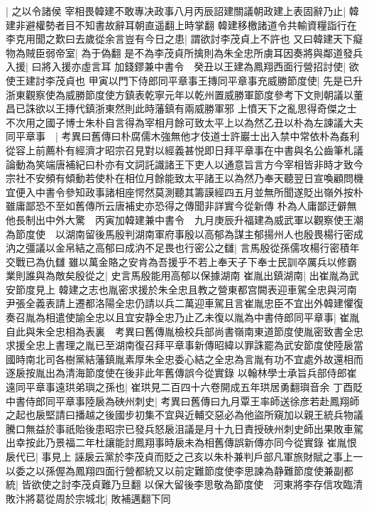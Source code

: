 |{
	之以令諸侯}
宰相畏韓建不敢專决政事八月丙辰詔建關議朝政建上表固辭乃止|{
	韓建非避權勢者目不知書故辭耳朝直遥翻上時掌翻}
韓建移檄諸道令共輸資糧詣行在李克用聞之歎曰去歲從余言豈有今日之患|{
	謂欲討李茂貞上不許也}
又曰韓建天下癡物為賊臣弱帝室|{
	為于偽翻}
是不為李茂貞所擒則為朱全忠所虜耳因奏將與鄰道發兵入援|{
	曰將入援亦虛言耳}
加錢鏐兼中書令　癸丑以王建為鳳翔西面行營招討使|{
	欲使王建討李茂貞也}
甲寅以門下侍郎同平章事王摶同平章事充威勝節度使|{
	先是已升浙東觀察使為威勝節度使方鎮表乾寧元年以乾州置威勝軍節度參考下文則朝議以董昌已誅欲以王摶代鎮浙東然則此時藩鎮有兩威勝軍邪}
上憤天下之亂思得奇傑之士不次用之國子博士朱朴自言得為宰相月餘可致太平上以為然乙丑以朴為左諫議大夫同平章事　|{
	考異曰舊傳曰朴腐儒木強無他才伎道士許巖士出入禁中常依朴為姦利從容上前薦朴有經濟才昭宗召見對以經義甚悦即日拜平章事在中書與名公齒筆札議論動為笑端唐補紀曰朴亦有文詞託識諸王下吏人以通意旨言方今宰相皆非時才致今宗社不安頻有傾動若使朴在相位月餘能致太平諸王以為然乃奉天聽翌日宣喚顧問機宜便入中書令參知政事諸相座愕然莫測聽其籌謨經四五月並無所聞遂貶出嶺外按朴雖庸鄙恐不至如舊傳所云唐補史亦恐得之傳聞非詳實今從新傳}
朴為人庸鄙迂僻無他長制出中外大驚　丙寅加韓建兼中書令　九月庚辰升福建為威武軍以觀察使王潮為節度使　以湖南留後馬殷判湖南軍府事殷以高郁為謀主郁揚州人也殷畏楊行密成汭之彊議以金帛結之高郁曰成汭不足畏也行密公之讎|{
	言馬殷從孫儒攻楊行密積年交戰已為仇讎}
雖以萬金賂之安肯為吾援乎不若上奉天子下奉士民訓卒厲兵以修霸業則誰與為敵矣殷從之|{
	史言馬殷能用高郁以保據湖南}
崔胤出鎮湖南|{
	出崔胤為武安節度見上}
韓建之志也胤密求援於朱全忠且教之營東都宫闕表迎車駕全忠與河南尹張全義表請上遷都洛陽全忠仍請以兵二萬迎車駕且言崔胤忠臣不宜出外韓建懼復奏召胤為相遣使諭全忠以且宜安静全忠乃止乙未復以胤為中書侍郎同平章事|{
	崔胤自此與朱全忠相為表裏　考異曰舊傳胤檢校兵部尚書嶺南東道節度使胤密致書全忠求援全忠上書理之胤已至湖南復召拜平章事新傳昭緯以罪誅罷為武安節度使陸扆當國時南北司各樹黨結藩鎮胤素厚朱全忠委心結之全忠為言胤有功不宜處外故還相而逐扆按胤出為清海節度使在後非此年舊傳誤今從實錄}
以翰林學士承旨兵部侍郎崔遠同平章事遠珙弟璵之孫也|{
	崔珙見二百四十六卷開成五年珙居勇翻璵音余}
丁酉貶中書侍郎同平章事陸扆為硤州刺史|{
	考異曰舊傳曰九月覃王率師送徐彦若赴鳳翔師之起也扆堅請曰播越之後國步初集不宜與近輔交惡必為他盜所窺加以親王統兵物議騰口無益於事祇貽後患昭宗已發兵怒扆沮議是月十九日責授硤州刺史師出果敗車駕出幸按此乃景福二年杜讓能討鳳翔事時扆未為相舊傳誤新傳亦同今從實錄}
崔胤恨扆代已|{
	事見上}
誣扆云黨於李茂貞而貶之己亥以朱朴兼判戶部凡軍旅財賦之事上一以委之以孫偓為鳳翔四面行營都統又以前定難節度使李思諫為静難節度使兼副都統|{
	皆欲使之討李茂貞難乃旦翻}
以保大留後李思敬為節度使　河東將李存信攻臨清敗汴將葛從周於宗城北|{
	敗補邁翻下同}
